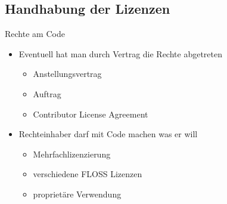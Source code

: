 \subsection{Handhabung der Lizenzen}
\label{sec:handhabung}
\subsectionframe

\begin{frame}{Rechte am Code}
	\begin{itemize}
		\item Eventuell hat man durch Vertrag die Rechte abgetreten
		\begin{itemize}
			\item Anstellungsvertrag
			\item Auftrag
			\item Contributor License Agreement
		\end{itemize}
		\item Rechteinhaber darf mit Code machen was er will
		\begin{itemize}
			\item Mehrfachlizenzierung
			\item verschiedene FLOSS Lizenzen
			\item proprietäre Verwendung
		\end{itemize}
	\end{itemize}
\end{frame}

